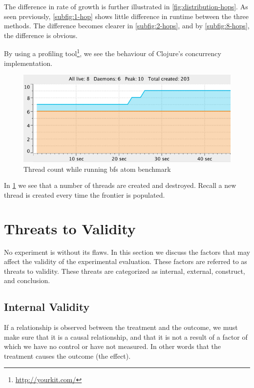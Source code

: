 				The difference in rate of growth is further illustrated in \cref{fig:distribution-hops}.  As seen previously, \cref{subfig:1-hop} shows little difference in runtime between the three methods.  The difference becomes clearer in \cref{subfig:2-hops}, and by \cref{subfig:8-hops}, the difference is obvious.
				
				By using a profiling tool\footnote{\url{http://yourkit.com/}}, we see the behaviour of Clojure's concurrency implementation.
				
				\begin{figure}
					\centering
					
					\includegraphics{figures/images/threads}
					
					\caption{Thread count while running \gls{bfs} atom benchmark}
					\label{fig:runtime-threads}
				\end{figure}
				
				In \cref{fig:runtime-threads} we see that a number of threads are created and destroyed.  Recall a new thread is created every time the frontier is populated.
	
	\section{Threats to Validity}
	\label{sec:threats-to-validity}
		No experiment is without its flaws.  In this section we discuss the factors that may affect the validity of the experimental evaluation.  These factors are referred to as threats to validity.  These threats are categorized as internal, external, construct, and conclusion.
		
		\subsection{Internal Validity}
		\label{sec:internal-validity}
			\begin{displayquote}
				If a relationship is observed between the treatment and the outcome, we must make sure that it is a causal relationship, and that it is not a result of a factor of which we have no control or have not measured. In other words that the treatment causes the outcome (the effect).
			\end{displayquote}
		
